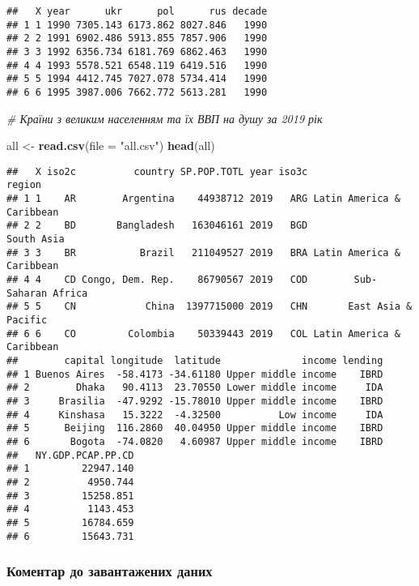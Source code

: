 \documentclass[
]{article}
\newenvironment{Shaded}{\begin{snugshade}}{\end{snugshade}}
\newcommand{\CommentTok}[1]{\textcolor[rgb]{0.56,0.35,0.01}{\textit{#1}}}
\newcommand{\DataTypeTok}[1]{\textcolor[rgb]{0.13,0.29,0.53}{#1}}
\newcommand{\KeywordTok}[1]{\textcolor[rgb]{0.13,0.29,0.53}{\textbf{#1}}}
\newcommand{\NormalTok}[1]{#1}
\newcommand{\StringTok}[1]{\textcolor[rgb]{0.31,0.60,0.02}{#1}}
\begin{document}
\begin{verbatim}
##   X year      ukr      pol      rus decade
## 1 1 1990 7305.143 6173.862 8027.846   1990
## 2 2 1991 6902.486 5913.855 7857.906   1990
## 3 3 1992 6356.734 6181.769 6862.463   1990
## 4 4 1993 5578.521 6548.119 6419.516   1990
## 5 5 1994 4412.745 7027.078 5734.414   1990
## 6 6 1995 3987.006 7662.772 5613.281   1990
\end{verbatim}

\begin{Shaded}
\begin{Highlighting}[]
\CommentTok{# Країни з великим населенням та їх ВВП на душу за 2019 рік}

\NormalTok{all <-}\StringTok{ }\KeywordTok{read.csv}\NormalTok{(}\DataTypeTok{file =} \StringTok{"all.csv"}\NormalTok{)}
\KeywordTok{head}\NormalTok{(all)}
\end{Highlighting}
\end{Shaded}

\begin{verbatim}
##   X iso2c          country SP.POP.TOTL year iso3c                    region
## 1 1    AR        Argentina    44938712 2019   ARG Latin America & Caribbean
## 2 2    BD       Bangladesh   163046161 2019   BGD                South Asia
## 3 3    BR           Brazil   211049527 2019   BRA Latin America & Caribbean
## 4 4    CD Congo, Dem. Rep.    86790567 2019   COD        Sub-Saharan Africa
## 5 5    CN            China  1397715000 2019   CHN       East Asia & Pacific
## 6 6    CO         Colombia    50339443 2019   COL Latin America & Caribbean
##        capital longitude  latitude              income lending
## 1 Buenos Aires  -58.4173 -34.61180 Upper middle income    IBRD
## 2        Dhaka   90.4113  23.70550 Lower middle income     IDA
## 3     Brasilia  -47.9292 -15.78010 Upper middle income    IBRD
## 4     Kinshasa   15.3222  -4.32500          Low income     IDA
## 5      Beijing  116.2860  40.04950 Upper middle income    IBRD
## 6       Bogota  -74.0820   4.60987 Upper middle income    IBRD
##   NY.GDP.PCAP.PP.CD
## 1         22947.140
## 2          4950.744
## 3         15258.851
## 4          1143.453
## 5         16784.659
## 6         15643.731
\end{verbatim}

\hypertarget{ux43aux43eux43cux435ux43dux442ux430ux440-ux434ux43e-ux437ux430ux432ux430ux43dux442ux430ux436ux435ux43dux438ux445-ux434ux430ux43dux438ux445}{%
\subsubsection{Коментар до завантажених
даних}\label{ux43aux43eux43cux435ux43dux442ux430ux440-ux434ux43e-ux437ux430ux432ux430ux43dux442ux430ux436ux435ux43dux438ux445-ux434ux430ux43dux438ux445}}
\end{document}
